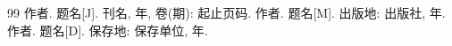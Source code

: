 
\begin{thebibliography}{99}
 作者. 题名[J]. 刊名, 年, 卷(期): 起止页码.
 作者. 题名[M]. 出版地: 出版社, 年.
 作者. 题名[D]. 保存地: 保存单位, 年.
\end{thebibliography}
